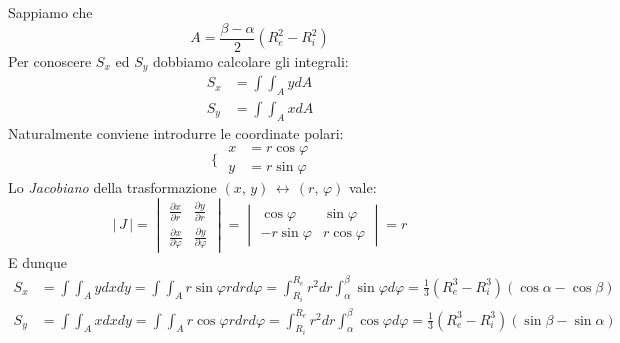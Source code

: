 \noindent Sappiamo che 
\begin{equation*}
A = \frac{\beta-\alpha}{2}(R_e^2-R_i^2)
\end{equation*}
Per conoscere $S_x$ ed $S_y$ dobbiamo calcolare gli integrali: 
\begin{align*}
S_x &= \int\int_A ydA \\
S_y &= \int\int_A xdA
\end{align*}
Naturalmente conviene introdurre le coordinate polari: 
\begin{equation*}
\,\,\Biggr\{\,\, 
\begin{aligned}
x &= r\cos\varphi \\
y &= r\sin\varphi
\end{aligned}
\end{equation*}
Lo \emph{Jacobiano} della trasformazione $(x,\,y)\,\leftrightarrow\,(r,\,\varphi)$ vale: 
\begin{equation*}
\lvert \, J \, \lvert =
\begin{vmatrix}
\frac{\partial x}{\partial r} & \frac{\partial y}{\partial r}\\
\frac{\partial x}{\partial\varphi} & \frac{\partial y}{\partial\varphi}
\end{vmatrix}
=
\begin{vmatrix}
\cos\varphi & \sin\varphi \\
-r\sin\varphi & r\cos\varphi
\end{vmatrix}
= r
\end{equation*}
E dunque
\begin{align*}
S_x &= \int\int_A ydxdy = \int\int_A r\sin\varphi rdrd\varphi = \int_{R_{i}}^{R_{e}} r^2dr\int_\alpha^\beta \sin\varphi d\varphi = \frac{1}{3}(R_e^3-R_i^3)(\cos\alpha-\cos\beta) \\
S_y &= \int\int_A xdxdy = \int\int_A r\cos\varphi rdrd\varphi = \int_{R_{i}}^{R_{e}} r^2dr\int_\alpha^\beta \cos\varphi d\varphi = \frac{1}{3}(R_e^3-R_i^3)(\sin\beta-\sin\alpha) 
\end{align*} 
